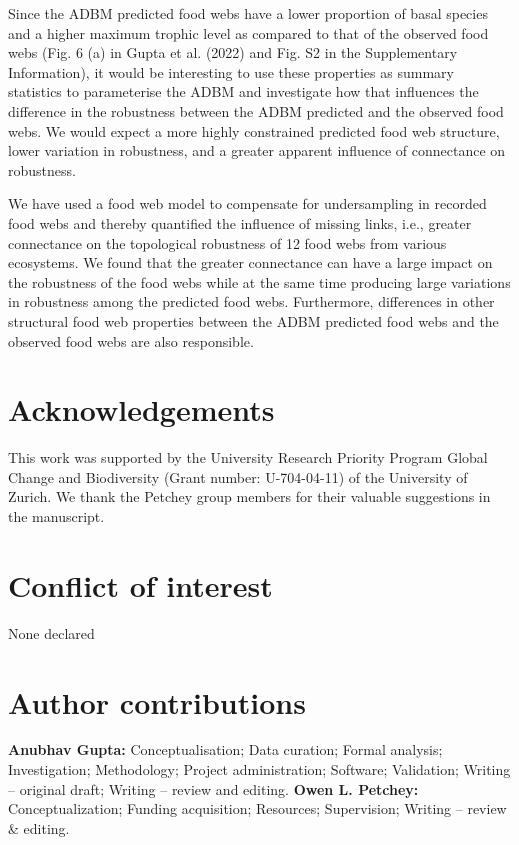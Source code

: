 \documentclass{article}
\begin{document}
Since the ADBM predicted food webs have a lower proportion of basal
species and a higher maximum trophic level as compared to that of the
observed food webs (Fig. 6 (a) in Gupta et al. (2022) and Fig. S2 in the
Supplementary Information), it would be interesting to use these
properties as summary statistics to parameterise the ADBM and
investigate how that influences the difference in the robustness between
the ADBM predicted and the observed food webs. We would expect a more
highly constrained predicted food web structure, lower variation in
robustness, and a greater apparent influence of connectance on
robustness.

We have used a food web model to compensate for undersampling in
recorded food webs and thereby quantified the influence of missing
links, i.e., greater connectance on the topological robustness of 12
food webs from various ecosystems. We found that the greater connectance
can have a large impact on the robustness of the food webs while at the
same time producing large variations in robustness among the predicted
food webs. Furthermore, differences in other structural food web
properties between the ADBM predicted food webs and the observed food
webs are also responsible.

\hypertarget{acknowledgements}{%
\section{Acknowledgements}\label{acknowledgements}}

This work was supported by the University Research Priority Program
Global Change and Biodiversity (Grant number: U-704-04-11) of the
University of Zurich. We thank the Petchey group members for their
valuable suggestions in the manuscript.

\hypertarget{conflict-of-interest}{%
\section{Conflict of interest}\label{conflict-of-interest}}

None declared

\hypertarget{author-contributions}{%
\section{Author contributions}\label{author-contributions}}

\textbf{Anubhav Gupta:} Conceptualisation; Data curation; Formal
analysis; Investigation; Methodology; Project administration; Software;
Validation; Writing -- original draft; Writing -- review and editing.
\textbf{Owen L. Petchey:} Conceptualization; Funding acquisition;
Resources; Supervision; Writing -- review \& editing.
\end{document}
